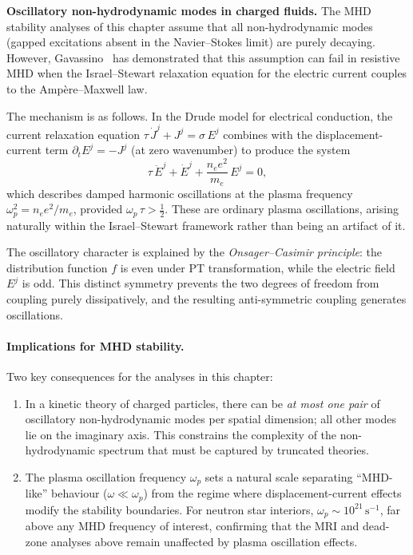 \begin{relcorrection}
\textbf{Oscillatory non-hydrodynamic modes in charged fluids.}
The MHD stability analyses of this chapter assume that all
non-hydrodynamic modes (gapped excitations absent in the
Navier--Stokes limit) are purely decaying.  However,
Gavassino~\cite{GavassinoPlasmaOscillationsIS2025} has demonstrated
that this assumption can fail in resistive MHD when the
Israel--Stewart relaxation equation for the electric current couples
to the Amp\`ere--Maxwell law.

The mechanism is as follows.  In the Drude model for electrical
conduction, the current relaxation equation
$\tau\,\dot{J}^j + J^j = \sigma\,E^j$ combines with the
displacement-current term $\partial_t E^j = -J^j$ (at zero
wavenumber) to produce the system
\begin{equation}
  \tau\,\ddot{E}^j + \dot{E}^j + \frac{n_e e^2}{m_e}\,E^j = 0,
  \label{eq:rel-9-plasma-osc}
\end{equation}
which describes damped harmonic oscillations at the plasma frequency
$\omega_p^2 = n_e e^2/m_e$, provided
$\omega_p\,\tau > \tfrac{1}{2}$.  These are ordinary plasma
oscillations, arising naturally within the Israel--Stewart framework
rather than being an artifact of it.

The oscillatory character is explained by the \emph{Onsager--Casimir
principle}: the distribution function $f$ is even under PT
transformation, while the electric field $E^j$ is odd.  This
distinct symmetry prevents the two degrees of freedom from coupling
purely dissipatively, and the resulting anti-symmetric coupling
generates oscillations.

\paragraph{Implications for MHD stability.}
Two key consequences for the analyses in this chapter:
\begin{enumerate}
  \item In a kinetic theory of charged particles, there can be
    \emph{at most one pair} of oscillatory non-hydrodynamic modes
    per spatial dimension; all other modes lie on the imaginary axis.
    This constrains the complexity of the non-hydrodynamic spectrum
    that must be captured by truncated theories.
  \item The plasma oscillation frequency $\omega_p$ sets a natural
    scale separating ``MHD-like'' behaviour ($\omega \ll \omega_p$)
    from the regime where displacement-current effects modify the
    stability boundaries.  For neutron star interiors,
    $\omega_p \sim 10^{21}\,\mathrm{s}^{-1}$, far above any MHD
    frequency of interest, confirming that the MRI and dead-zone
    analyses above remain unaffected by plasma oscillation effects.
\end{enumerate}
\end{relcorrection}

